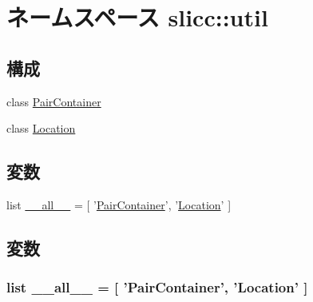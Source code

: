 \hypertarget{namespaceslicc_1_1util}{
\section{ネームスペース slicc::util}
\label{namespaceslicc_1_1util}
}
\subsection*{構成}
\begin{DoxyCompactItemize}
\item 
class \hyperlink{classslicc_1_1util_1_1PairContainer}{PairContainer}
\item 
class \hyperlink{classslicc_1_1util_1_1Location}{Location}
\end{DoxyCompactItemize}
\subsection*{変数}
\begin{DoxyCompactItemize}
\item 
list \hyperlink{namespaceslicc_1_1util_aa4a022e6ddacd362b83964da5cc5d044}{\_\-\_\-all\_\-\_\-} = \mbox{[} '\hyperlink{classslicc_1_1util_1_1PairContainer}{PairContainer}', '\hyperlink{classslicc_1_1util_1_1Location}{Location}' \mbox{]}
\end{DoxyCompactItemize}


\subsection{変数}
\hypertarget{namespaceslicc_1_1util_aa4a022e6ddacd362b83964da5cc5d044}{
\subsubsection[{\_\-\_\-all\_\-\_\-}]{\setlength{\rightskip}{0pt plus 5cm}list {\bf \_\-\_\-all\_\-\_\-} = \mbox{[} '{\bf PairContainer}', '{\bf Location}' \mbox{]}}}
\label{namespaceslicc_1_1util_aa4a022e6ddacd362b83964da5cc5d044}
